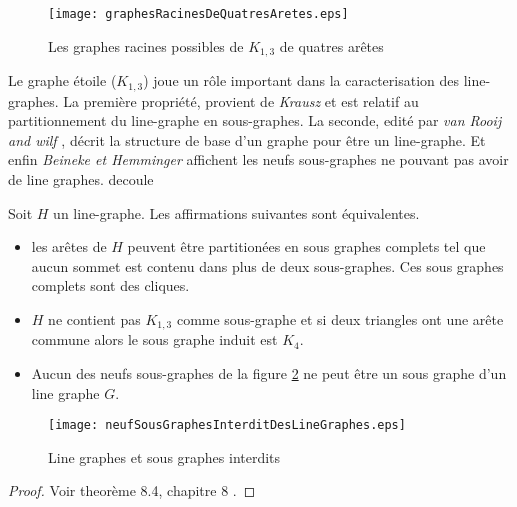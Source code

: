 \begin{figure}[htb!]\vspace{-0.5em}
	\centering
	\texttt{[image: graphesRacinesDeQuatresAretes.eps]}\vspace{-0.5em}
	\caption{ Les graphes racines possibles de $K_{1,3}$ de quatres ar\^etes   }\vspace{-0.5em}
	\label{graphesRacinesDeQuatresAretes}
\end{figure}

Le graphe \'etoile ($K_{1,3}$) joue un r\^ole important dans la caracterisation des line-graphes.
La premi\`ere propri\'et\'e, provient de {\em Krausz} \cite{krausz1943demonstration} et est relatif au partitionnement du line-graphe en sous-graphes. La seconde, edit\'e par {\em van Rooij and wilf} \cite{ROOIJetWILF1965interchange}, d\'ecrit la structure de base d'un graphe pour \^etre un line-graphe. Et enfin {\em Beineke\cite{beineke1968derived} et Hemminger}   affichent les neufs sous-graphes ne pouvant pas avoir de line graphes. decoule
\begin{theorem}
\label{caracteristiquesLinegraphes}
Soit $H$ un line-graphe. Les affirmations suivantes sont \'equivalentes.
\begin{itemize}
	\item les ar\^etes de $H$ peuvent \^etre partition\'ees en sous graphes complets tel que aucun sommet est contenu dans plus de deux sous-graphes. Ces sous graphes complets sont des cliques.
	\item $H$ ne contient pas $K_{1,3}$ comme sous-graphe et si deux triangles ont une ar\^ete commune alors le sous graphe induit est $K_4$.
	\item Aucun des neufs sous-graphes de la figure \ref{neufSousGraphesInterditDesLineGraphes} ne peut \^etre un sous graphe d'un line graphe $G$.
\end{itemize}
\end{theorem}

\begin{figure}[htb!]\vspace{-0.5em}
	\centering
	\texttt{[image: neufSousGraphesInterditDesLineGraphes.eps]}\vspace{-0.5em}
	\caption{ Line graphes et sous graphes interdits }\vspace{-0.5em}
	\label{neufSousGraphesInterditDesLineGraphes}
\end{figure}

\begin{proof}
Voir theor\`eme 8.4, chapitre 8 \cite{lineGraphe}.
\end{proof}
